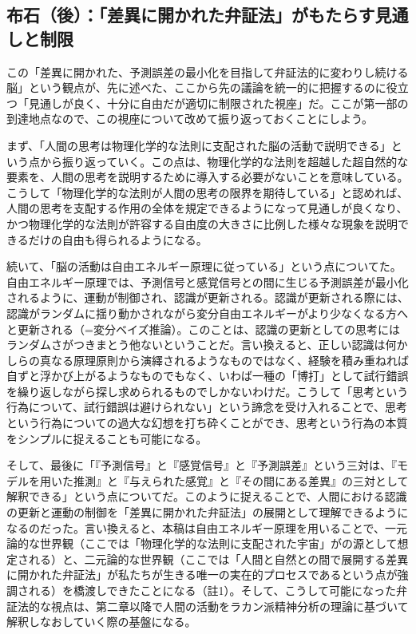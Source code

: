 \subsection{布石（後）：「差異に開かれた弁証法」がもたらす見通しと制限}\label{ux5e03ux77f3ux5f8cux5deeux7570ux306bux958bux304bux308cux305fux5f01ux8a3cux6cd5ux304cux3082ux305fux3089ux3059ux898bux901aux3057ux3068ux5236ux9650}

この「差異に開かれた、\mbox{予測誤差}の最小化を目指して\mbox{弁証法}的に変わりし続ける脳」という観点が、先に述べた、ここから先の議論を統一的に把握するのに役立つ「見通しが良く、十分に自由だが適切に制限された視座」だ。ここが第一部の到達地点なので、この視座について改めて振り返っておくことにしよう。

まず、「人間の思考は物理化学的な法則に支配された脳の活動で説明できる」という点から振り返っていく。この点は、物理化学的な法則を超越した超自然的な要素を、人間の思考を説明するために導入する必要がないことを意味している。こうして「物理化学的な法則が人間の思考の限界を期待している」と認めれば、人間の思考を支配する作用の全体を規定できるようになって見通しが良くなり、かつ物理化学的な法則が許容する自由度の大きさに比例した様々な現象を説明できるだけの自由も得られるようになる。

続いて、「脳の活動は\mbox{自由エネルギー原理}に従っている」という点についてた。\mbox{自由エネルギー原理}では、予測信号と感覚信号との間に生じる\mbox{予測誤差}が最小化されるように、運動が制御され、認識が更新される。認識が更新される際には、認識がランダムに揺り動かされながら変分自由エネルギーがより少なくなる方へと更新される（=変分ベイズ推論）。このことは、認識の更新としての思考にはランダムさがつきまとう他ないということだ。言い換えると、正しい認識は何かしらの真なる原理原則から演繹されるようなものではなく、経験を積み重ねれば自ずと浮かび上がるようなものでもなく、いわば一種の「博打」として試行錯誤を繰り返しながら探し求められるものでしかないわけだ。こうして「思考という行為について、試行錯誤は避けられない」という諦念を受け入れることで、思考という行為についての過大な幻想を打ち砕くことができ、思考という行為の本質をシンプルに捉えることも可能になる。

そして、最後に「『予測信号』と『感覚信号』と『\mbox{予測誤差}』という三対は、『モデルを用いた推測』と『与えられた感覚』と『その間にある差異』の三対として解釈できる」という点についてだ。このように捉えることで、人間における認識の更新と運動の制御を「差異に開かれた\mbox{弁証法}」の展開として理解できるようになるのだった。言い換えると、本稿は\mbox{自由エネルギー原理}を用いることで、一元論的な世界観（ここでは「物理化学的な法則に支配された宇宙」がの源として想定される）と、二元論的な世界観（ここでは「人間と自然との間で展開する差異に開かれた\mbox{弁証法}」が私たちが生きる唯一の実在的プロセスであるという点が強調される）を橋渡しできたことになる（註1）。そして、こうして可能になった\mbox{弁証法}的な視点は、第二章以降で人間の活動をラカン派精神分析の理論に基づいて解釈しなおしていく際の基盤になる。

